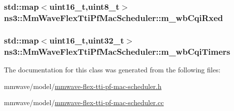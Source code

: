 \subsubsection[{\texorpdfstring{m\+\_\+wb\+Cqi\+Rxed}{m_wbCqiRxed}}]{\setlength{\rightskip}{0pt plus 5cm}std\+::map$<$uint16\+\_\+t,uint8\+\_\+t$>$ ns3\+::\+Mm\+Wave\+Flex\+Tti\+Pf\+Mac\+Scheduler\+::m\+\_\+wb\+Cqi\+Rxed\hspace{0.3cm}{\ttfamily [private]}}\hypertarget{classns3_1_1MmWaveFlexTtiPfMacScheduler_a2b746dc09bafd9ebdc2912b26c74beb9}{}\label{classns3_1_1MmWaveFlexTtiPfMacScheduler_a2b746dc09bafd9ebdc2912b26c74beb9}
\subsubsection[{\texorpdfstring{m\+\_\+wb\+Cqi\+Timers}{m_wbCqiTimers}}]{\setlength{\rightskip}{0pt plus 5cm}std\+::map$<$uint16\+\_\+t,uint32\+\_\+t$>$ ns3\+::\+Mm\+Wave\+Flex\+Tti\+Pf\+Mac\+Scheduler\+::m\+\_\+wb\+Cqi\+Timers\hspace{0.3cm}{\ttfamily [private]}}\hypertarget{classns3_1_1MmWaveFlexTtiPfMacScheduler_a3a90d6728425934c4358680b51666147}{}\label{classns3_1_1MmWaveFlexTtiPfMacScheduler_a3a90d6728425934c4358680b51666147}


The documentation for this class was generated from the following files\+:\begin{DoxyCompactItemize}
\item 
mmwave/model/\hyperlink{mmwave-flex-tti-pf-mac-scheduler_8h}{mmwave-\/flex-\/tti-\/pf-\/mac-\/scheduler.\+h}\item 
mmwave/model/\hyperlink{mmwave-flex-tti-pf-mac-scheduler_8cc}{mmwave-\/flex-\/tti-\/pf-\/mac-\/scheduler.\+cc}\end{DoxyCompactItemize}
